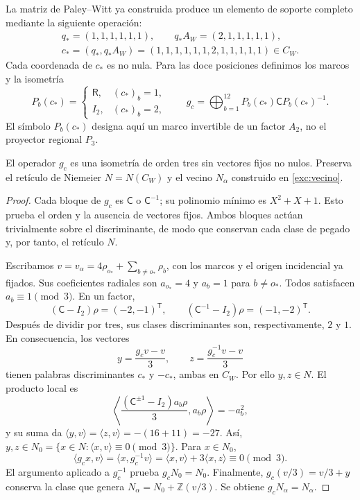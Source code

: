 La matriz de Paley--Witt ya construida produce un elemento de soporte
completo mediante la siguiente operación:
\begin{equation}
 \begin{gathered}
 q_*=(1,1,1,1,1,1),\qquad q_*A_W=(2,1,1,1,1,1),\\
 c_*=(q_*,q_*A_W)
 =(1,1,1,1,1,1,2,1,1,1,1,1)\in C_W.
 \end{gathered}
 \label{km:palabra-total}
\end{equation}
Cada coordenada de \(c_*\) es no nula. Para las doce posiciones
definimos los marcos y la isometría
\begin{equation}
 P_b(c_*)=
 \begin{cases}\mathsf R,&(c_*)_b=1,\\I_2,&(c_*)_b=2,\end{cases}
 \qquad
 g_c=\bigoplus_{b=1}^{12}P_b(c_*)\mathsf C P_b(c_*)^{-1}.
 \label{km:isometria-ternaria}
\end{equation}
El símbolo \(P_b(c_*)\) designa aquí un marco invertible de un factor
\(A_2\), no el proyector regional \(P_3\).

\begin{proposition}
\label{km:estabilidad-vecino}
El operador \(g_c\) es una isometría de orden tres sin vectores fijos
no nulos. Preserva el retículo de Niemeier \(N=N(C_W)\) y el vecino
\(N_\alpha\) construido en \eqref{exc:vecino}.
\end{proposition}
\begin{proof}
Cada bloque de \(g_c\) es \(\mathsf C\) o \(\mathsf C^{-1}\);
su polinomio mínimo es \(X^2+X+1\). Esto prueba el orden y la
ausencia de vectores fijos. Ambos bloques actúan trivialmente sobre el
discriminante, de modo que conservan cada clase de pegado y, por tanto,
el retículo \(N\).

Escribamos \(v=v_\alpha=4\rho_{o_*}+\sum_{b\ne o_*}\rho_b\),
con los marcos y el origen incidencial ya fijados. Sus coeficientes
radiales son \(a_{o_*}=4\) y \(a_b=1\) para \(b\ne o_*\).
Todos satisfacen \(a_b\equiv1\pmod3\). En un factor,
\[
 (\mathsf C-I_2)\rho=(-2,-1)^{\mathsf T},\qquad
 (\mathsf C^{-1}-I_2)\rho=(-1,-2)^{\mathsf T}.
\]
Después de dividir por tres, sus clases discriminantes son,
respectivamente, \(2\) y \(1\). En consecuencia, los vectores
\begin{equation}
 y=\frac{g_cv-v}{3},\qquad z=\frac{g_c^{-1}v-v}{3}
 \label{km:desplazamientos}
\end{equation}
tienen palabras discriminantes \(c_*\) y \(-c_*\), ambas en
\(C_W\). Por ello \(y,z\in N\). El producto local es
\[
 \left\langle
 \frac{(\mathsf C^{\pm1}-I_2)a_b\rho}{3},a_b\rho
 \right\rangle=-a_b^2,
\]
y su suma da
\(\langle y,v\rangle=\langle z,v\rangle=-(16+11)=-27\).
Así, \(y,z\in N_0=\{x\in N:\langle x,v\rangle\equiv0\pmod3\}\).
Para \(x\in N_0\),
\[
 \langle g_cx,v\rangle
 =\langle x,g_c^{-1}v\rangle
 =\langle x,v\rangle+3\langle x,z\rangle\equiv0\pmod3.
\]
El argumento aplicado a \(g_c^{-1}\) prueba \(g_cN_0=N_0\).
Finalmente, \(g_c(v/3)=v/3+y\) conserva la clase que genera
\(N_\alpha=N_0+\mathbb Z(v/3)\). Se obtiene
\(g_cN_\alpha=N_\alpha\).
\end{proof}

